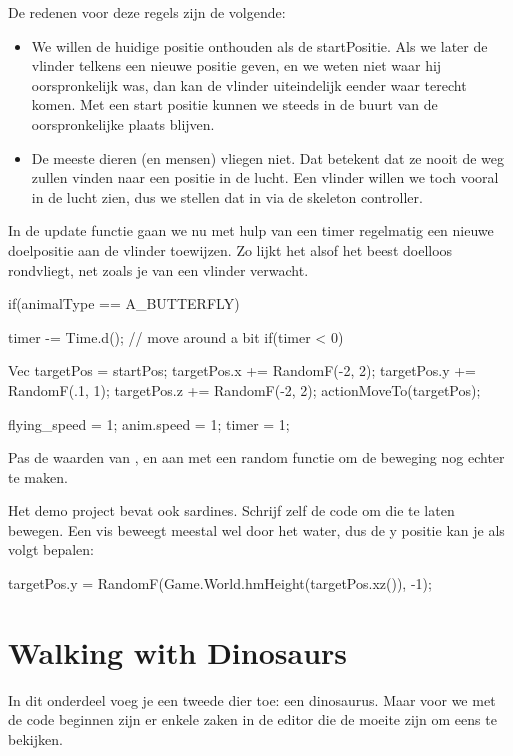 De redenen voor deze regels zijn de volgende:
\begin{itemize}
	\item We willen de huidige positie onthouden als de startPositie. Als we later de vlinder telkens een nieuwe positie geven, en we weten niet waar hij oorspronkelijk was, dan kan de vlinder uiteindelijk eender waar terecht komen. Met een start positie kunnen we steeds in de buurt van de oorspronkelijke plaats blijven.
	\item De meeste dieren (en mensen) vliegen niet. Dat betekent dat ze nooit de weg zullen vinden naar een positie in de lucht. Een vlinder willen we toch vooral in de lucht zien, dus we stellen dat in via de skeleton controller.
\end{itemize}

In de update functie gaan we nu met hulp van een timer regelmatig een nieuwe doelpositie aan de vlinder toewijzen. Zo lijkt het alsof het beest doelloos rondvliegt, net zoals je van een vlinder verwacht.

\begin{code}
if(animalType == A_BUTTERFLY)
{
 	timer -= Time.d();
 	// move around a bit
 	if(timer < 0)
 	{
    	Vec targetPos = startPos;
	    targetPos.x += RandomF(-2, 2);
	    targetPos.y += RandomF(.1, 1);
	    targetPos.z += RandomF(-2, 2);
	    actionMoveTo(targetPos);
	    
	    flying_speed = 1;
	    anim.speed = 1;
	    timer = 1;
 	}
}
\end{code}

\begin{exercise}
Pas de waarden van ,  en  aan met een random functie om de beweging nog echter te maken.

Het demo project bevat ook sardines. Schrijf zelf de code om die te laten bewegen. Een vis beweegt meestal wel door het water, dus de y positie kan je als volgt bepalen:

\begin{code}
targetPos.y = RandomF(Game.World.hmHeight(targetPos.xz()), -1);
\end{code}

\end{exercise}

\section{Walking with Dinosaurs}
In dit onderdeel voeg je een tweede dier toe: een dinosaurus. Maar voor we met de code beginnen zijn er enkele zaken in de editor die de moeite zijn om eens te bekijken.


